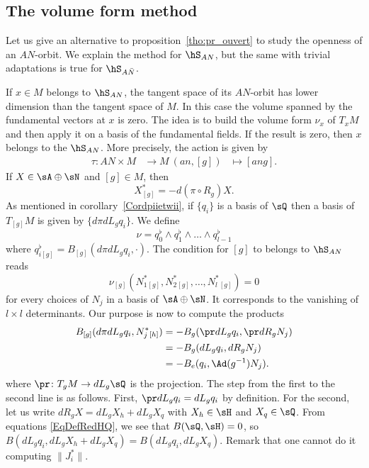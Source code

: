 \subsection{The volume form method}    \label{subsecVolumeForm}

Let us give an alternative to proposition~\ref{tho:pr_ouvert} to study the openness of an $AN$-orbit. We explain the method for $\hS_{AN}$, but the same with trivial adaptations is true for $\hS_{A\bar{N}}$.

If $x\in M$ belongs to $\hS_{AN}$, the tangent space of its $AN$-orbit has lower dimension than the tangent space of $M$.  In this case the volume spanned by the fundamental vectors at $x$ is zero.  The idea is to build the volume form $\nu_x$ of $T_xM$ and then apply it on a basis of the fundamental fields.  If the result is zero, then $x$ belongs to the $\hS_{AN}$.  More precisely, the action is given by
		\begin{equation}
		\begin{aligned}
			\tau \colon AN\times M &\to M\
			(an,[g])&\mapsto [ang].
		\end{aligned}
	\end{equation}
If $X\in\sA\oplus\sN$ and $[g]\in M$, then
\begin{equation}
  X^*_{[g]}=-d(\pi\circ R_g)X.
\end{equation}
As mentioned in corollary~\ref{Cordpiietwii}, if $\{q_i\}$ is a basis of $\sQ$ then a basis of $T_{[g]}M$ is given by $\{d\pi dL_gq_i\}$. We define
\[
\nu=q_0^{\flat}\wedge q_1^{\flat}\wedge \ldots \wedge
q_{l-1}^{\flat}
\]
where $q_{i[g]}^{\flat}=B_{[g]}(d\pi dL_g q_i,\cdot)$. The condition for $[g]$ to belongs to $\hS_{AN}$ reads
\begin{equation}\label{eq:nusurN}
\nu_{[g]}(N_1^*{}_{[g]},N_2^*{}_{[g]},\ldots,N_l^*{}_{[g]})=0
\end{equation}
for every choices of $N_j$ in a basis of $\sA\oplus\sN$. It corresponds to the vanishing of $l \times l$ determinants. Our purpose is now to compute the products
\[
\begin{split}
  B_{[g]}(d\pi dL_g q_i,N^*_j{}_{[h]})	&=-B_g(\pr dL_g q_i,\pr dR_g N_j)\\
					&=-B_g(dL_g q_i,dR_g N_j)\\
					&=-B_e(q_i,\Ad(g^{-1})N_j).
\end{split}
\]
where $\pr\colon T_{g}M\to dL_{g}\sQ$ is the projection. The step from the first to the second line is as follows. First, $\pr dL_gq_i=dL_gq_i$ by definition. For the second, let us write $dR_g X=dL_g X_h+dL_g X_q$ with $X_h\in\sH$ and $X_q\in\sQ$. From equations \eqref{EqDefRedHQ}, we see that $B(\sQ,\sH)=0$, so $B(dL_g q_i,dL_g X_h+dL_g X_q)=B(dL_g q_i,dL_g X_q)$. Remark that one cannot do it computing $\|J_i^*\|$.

